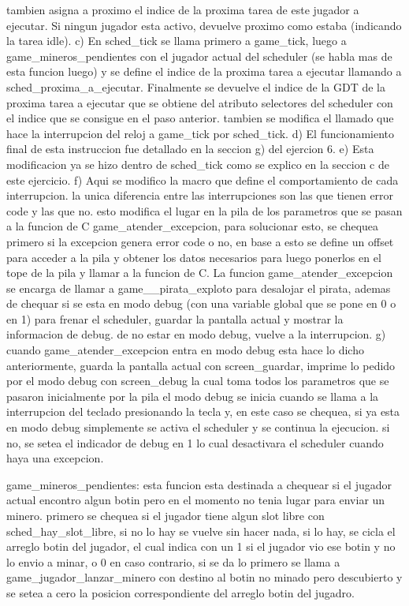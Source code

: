   tambien asigna a proximo el indice de la proxima tarea de este jugador a ejecutar.
  Si ningun jugador esta activo, devuelve proximo como estaba (indicando la tarea idle).
c) En sched_tick se llama primero a game_tick, luego a game_mineros_pendientes con el jugador actual del scheduler (se habla mas
  de esta funcion luego) y se define el indice de la proxima tarea a ejecutar llamando a sched_proxima_a_ejecutar.
  Finalmente se devuelve el indice de la GDT de la proxima tarea a ejecutar que se obtiene del atributo selectores del scheduler
  con el indice que se consigue en el paso anterior. tambien se modifica el llamado que hace la interrupcion del reloj a game_tick
  por sched_tick.
d) El funcionamiento final de esta instruccion fue detallado en la seccion g) del ejercion 6.
e) Esta modificacion ya se hizo dentro de sched_tick como se explico en la seccion c de este ejercicio.
f) Aqui se modifico la macro que define el comportamiento de cada interrupcion. la unica diferencia entre las interrupciones
  son las que tienen error code y las que no. esto modifica el lugar en la pila de los parametros que se pasan a la funcion de C
  game_atender_excepcion, para solucionar esto, se chequea primero si la excepcion genera error code o no, en base a esto se define un
  offset para acceder a la pila y obtener los datos necesarios para luego ponerlos en el tope de la pila y llamar a la funcion de C.
  La funcion game_atender_excepcion se encarga de llamar a game__pirata_exploto para desalojar el pirata, ademas de chequar
  si se esta en modo debug (con una variable global que se pone en 0 o en 1) para frenar el scheduler, guardar la pantalla actual y mostrar la informacion de debug. de no estar
  en modo debug, vuelve a la interrupcion.
g) cuando game_atender_excepcion entra en modo debug esta hace lo dicho anteriormente, guarda la pantalla actual con screen_guardar,
  imprime lo pedido por el modo debug con screen_debug la cual toma todos los parametros que se pasaron inicialmente por la pila
  el modo debug se inicia cuando se llama a la interrupcion del teclado presionando la tecla y, en este caso se chequea, si ya esta en modo
  debug simplemente se activa el scheduler y se continua la ejecucion. si no, se setea el indicador de debug en 1 lo cual desactivara
  el scheduler cuando haya una excepcion.




game_mineros_pendientes:
  esta funcion esta destinada a chequear si el jugador actual encontro algun botin pero en el momento no tenia lugar para enviar
  un minero.
  primero se chequea si el jugador tiene algun slot libre con sched_hay_slot_libre, si no lo hay se vuelve sin hacer nada,
  si lo hay, se cicla el arreglo botin del jugador, el cual indica con un 1 si el jugador vio ese botin y no lo envio a minar, o
  0 en caso contrario, si se da lo primero se llama a game_jugador_lanzar_minero con destino al botin no minado pero descubierto
  y se setea a cero la posicion correspondiente del arreglo botin del jugadro.

